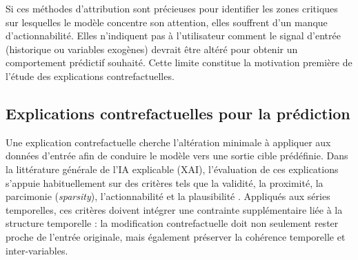 Si ces méthodes d'attribution sont précieuses pour identifier les zones critiques sur lesquelles le modèle concentre son attention, elles souffrent d'un manque d'actionnabilité. Elles n'indiquent pas à l'utilisateur comment le signal d'entrée (historique ou variables exogènes) devrait être altéré pour obtenir un comportement prédictif souhaité. Cette limite constitue la motivation première de l'étude des explications contrefactuelles.

\subsection{Explications contrefactuelles pour la prédiction}

Une explication contrefactuelle cherche l'altération minimale à appliquer aux données d'entrée afin de conduire le modèle vers une sortie cible prédéfinie. Dans la littérature générale de l'IA explicable (XAI), l'évaluation de ces explications s'appuie habituellement sur des critères tels que la validité, la proximité, la parcimonie (\textit{sparsity}), l'actionnabilité et la plausibilité \cite{guidotti2024counterfactual, moreira2025benchmarking}. Appliqués aux séries temporelles, ces critères doivent intégrer une contrainte supplémentaire liée à la structure temporelle : la modification contrefactuelle doit non seulement rester proche de l'entrée originale, mais également préserver la cohérence temporelle et inter-variables.

